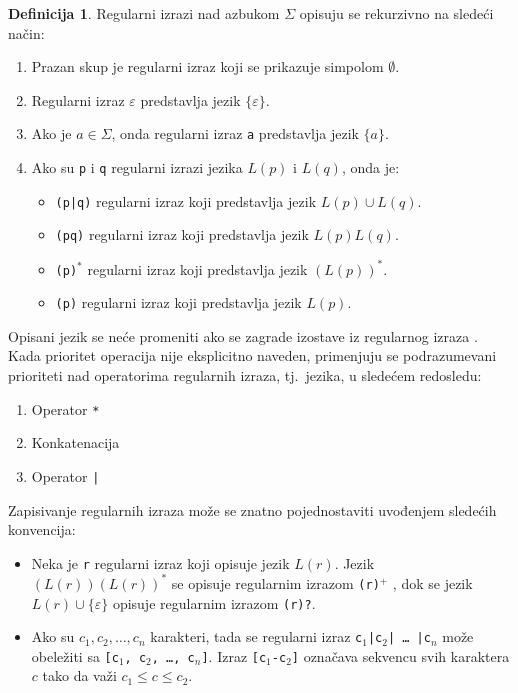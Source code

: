 \documentclass[12pt,oneside]{memoir}
\theoremstyle{plain}
\theoremstyle{definition}
\newtheorem{defn}{Definicija} %
\begin{document}
\begin{defn}
Regularni izrazi nad azbukom $\Sigma$ opisuju se rekurzivno na sledeći način:
\begin{enumerate}
\item Prazan skup je regularni izraz koji se prikazuje simpolom \texttt{$\emptyset$}.
\item Regularni izraz \texttt{$\varepsilon$} predstavlja jezik $\{\varepsilon\}$.
\item Ako je $a \in \Sigma$, onda regularni izraz \texttt{a} predstavlja jezik $\{a\}$.
\item Ako su \texttt{p} i \texttt{q} regularni izrazi jezika $L(p)$ i $L(q)$, onda je:
\begin{itemize}
\item \texttt{(p|q)} regularni izraz koji predstavlja jezik $L(p) \cup L(q)$.
\item \texttt{(pq)} regularni izraz koji predstavlja jezik $L(p)L(q)$.
\item \texttt{(p)$^*$} regularni izraz koji predstavlja jezik $(L(p))^*$.
\item \texttt{(p)} regularni izraz koji predstavlja jezik $L(p)$.
\end{itemize}
\end{enumerate}
\end{defn}

Opisani jezik se neće promeniti ako se zagrade izostave iz regularnog izraza \cite{Vitas}. Kada prioritet operacija nije eksplicitno naveden, primenjuju se podrazumevani prioriteti nad operatorima regularnih izraza, tj.~jezika, u sledećem redosledu:
\begin{enumerate}
	\item Operator \texttt{*}
	\item Konkatenacija
	\item Operator \texttt{|}
\end{enumerate}

Zapisivanje regularnih izraza može se znatno pojednostaviti uvođenjem sledećih konvencija:
\begin{itemize}
\item Neka je \texttt{r} regularni izraz koji opisuje jezik $L(r)$. Jezik $(L(r))(L(r))^*$ se opisuje regularnim izrazom \texttt{(r)$^+$} , dok se jezik $L(r) \cup \{\varepsilon\}$ opisuje regularnim izrazom \texttt{(r)?}.
\item Ako su $c_1, c_2, …, c_n$ karakteri, tada se regularni izraz \texttt{c$_1$|c$_2$| … |c$_n$} može obeležiti sa \texttt{[c$_1$, c$_2$, …, c$_n$]}. Izraz \texttt{[c$_1$-c$_2$]} označava sekvencu svih karaktera $c$ tako da važi $c_1 \leq c \leq c_2$.
\end{itemize}
\end{document}
